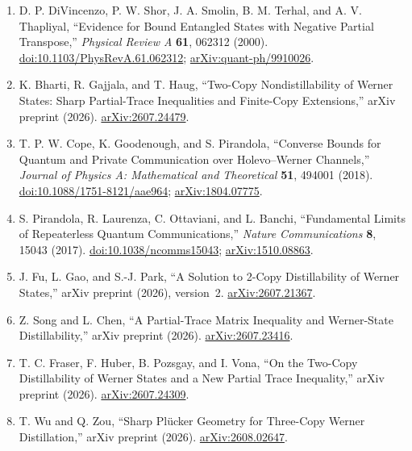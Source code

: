 \begin{enumerate}[label={},leftmargin=4.8em,labelsep=0.5em]
  \footnotesize
  \item[\textup{[DSS+00]}]\label{ref:fc66-divincenzo-et-al}
  D. P. DiVincenzo, P. W. Shor, J. A. Smolin, B. M. Terhal, and
  A. V. Thapliyal,
  ``Evidence for Bound Entangled States with Negative Partial Transpose,''
  \emph{Physical Review A} \textbf{61}, 062312 (2000).
  \href{https://doi.org/10.1103/PhysRevA.61.062312}{doi:10.1103/PhysRevA.61.062312};
  \href{https://arxiv.org/abs/quant-ph/9910026}{arXiv:quant-ph/9910026}.

  \item[\textup{[BGH26]}]\label{ref:fc66-bharti-et-al}
  K. Bharti, R. Gajjala, and T. Haug,
  ``Two-Copy Nondistillability of Werner States: Sharp Partial-Trace
  Inequalities and Finite-Copy Extensions,'' arXiv preprint (2026).
  \href{https://arxiv.org/abs/2607.24479}{arXiv:2607.24479}.

  \item[\textup{[CGP18]}]\label{ref:fc66-cope-goodenough-pirandola}
  T. P. W. Cope, K. Goodenough, and S. Pirandola,
  ``Converse Bounds for Quantum and Private Communication over
  Holevo--Werner Channels,''
  \emph{Journal of Physics A: Mathematical and Theoretical} \textbf{51},
  494001 (2018).
  \href{https://doi.org/10.1088/1751-8121/aae964}{doi:10.1088/1751-8121/aae964};
  \href{https://arxiv.org/abs/1804.07775}{arXiv:1804.07775}.

  \item[\textup{[PLOB17]}]\label{ref:fc66-plob}
  S. Pirandola, R. Laurenza, C. Ottaviani, and L. Banchi,
  ``Fundamental Limits of Repeaterless Quantum Communications,''
  \emph{Nature Communications} \textbf{8}, 15043 (2017).
  \href{https://doi.org/10.1038/ncomms15043}{doi:10.1038/ncomms15043};
  \href{https://arxiv.org/abs/1510.08863}{arXiv:1510.08863}.

  \item[\textup{[FGP26]}]\label{ref:fc66-fu-gao-park}
  J. Fu, L. Gao, and S.-J. Park,
  ``A Solution to 2-Copy Distillability of Werner States,''
  arXiv preprint (2026), version~2.
  \href{https://arxiv.org/abs/2607.21367}{arXiv:2607.21367}.

  \item[\textup{[SC26]}]\label{ref:fc66-song-chen}
  Z. Song and L. Chen,
  ``A Partial-Trace Matrix Inequality and Werner-State Distillability,''
  arXiv preprint (2026).
  \href{https://arxiv.org/abs/2607.23416}{arXiv:2607.23416}.

  \item[\textup{[FHPV26]}]\label{ref:fc66-fraser-et-al}
  T. C. Fraser, F. Huber, B. Pozsgay, and I. Vona,
  ``On the Two-Copy Distillability of Werner States and a New Partial Trace
  Inequality,'' arXiv preprint (2026).
  \href{https://arxiv.org/abs/2607.24309}{arXiv:2607.24309}.

  \item[\textup{[WZ26]}]\label{ref:fc66-wu-zou}
  T. Wu and Q. Zou,
  ``Sharp Pl\"ucker Geometry for Three-Copy Werner Distillation,''
  arXiv preprint (2026).
  \href{https://arxiv.org/abs/2608.02647}{arXiv:2608.02647}.
\end{enumerate}

